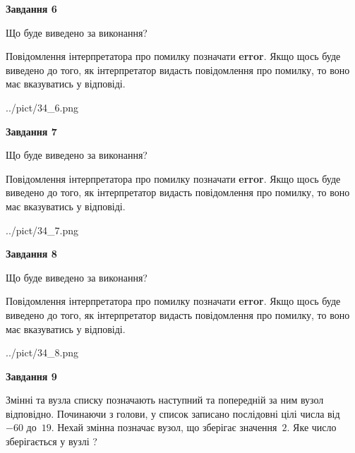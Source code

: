 \documentclass[12pt, ukrainian]{article}
\begin{document}
{\begin {large}
{\begin {center}\textbf{Завдання 6}\end {center}}\par
Що буде виведено за виконання?

Повідомлення інтерпретатора про помилку позначати \textbf{error}.
Якщо щось буде виведено до того, як інтерпретатор видасть повідомлення про помилку, 
то воно має вказуватись у відповіді. \par


\begin{center}
	{../pict/34_6.png}
\end{center}
\newpage

{\begin {center}\textbf{Завдання 7}\end {center}}\par
Що буде виведено за виконання?

Повідомлення інтерпретатора про помилку позначати \textbf{error}.
Якщо щось буде виведено до того, як інтерпретатор видасть повідомлення про помилку, 
то воно має вказуватись у відповіді. \par


\begin{center}
	{../pict/34_7.png}
\end{center}
\newpage

{\begin {center}\textbf{Завдання 8}\end {center}}\par
Що буде виведено за виконання?

Повідомлення інтерпретатора про помилку позначати \textbf{error}.
Якщо щось буде виведено до того, як інтерпретатор видасть повідомлення про помилку, 
то воно має вказуватись у відповіді. \par


\begin{center}
	{../pict/34_8.png}
\end{center}
\newpage

{\begin {center}\textbf{Завдання 9}\end {center}}\par
Змінні  та  вузла списку позначають наступний та попередній за ним вузол відповідно. Починаючи з голови, у список записано послідовні цілі числа від~$-60$ до~$19$. Нехай змінна  позначає вузол, що зберігає значення~$2$.
Яке число зберігається у вузлі  ?\par
\newpage


\end{large}}
\end{document}
